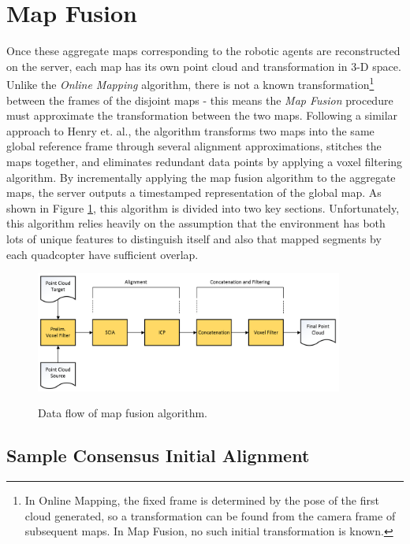 \documentclass[letterpaper, oneside, 10pt]{report}
\begin{document}
\section{Map Fusion}
\noindent Once these aggregate maps corresponding to the robotic agents are reconstructed on the server, each map has its own point cloud and transformation in 3-D space. Unlike the \textsl{Online Mapping} algorithm, there is not a known transformation\footnote{In Online Mapping, the fixed frame is determined by the pose of the first cloud generated, so a transformation can be found from the camera frame of subsequent maps. In Map Fusion, no such initial transformation is known.} between the frames of the disjoint maps - this means the \textsl{Map Fusion} procedure must approximate the transformation between the two maps. Following a similar approach to Henry et. al.\cite{henry2012rgb}, the algorithm transforms two maps into the same global reference frame through several alignment approximations, stitches the maps together, and eliminates redundant data points by applying a voxel filtering algorithm. By incrementally applying the map fusion algorithm to the aggregate maps, the server outputs a timestamped representation of the global map. As shown in Figure \ref{fig: map fusion.}, this algorithm is divided into two key sections. Unfortunately, this algorithm relies heavily on the assumption that the environment has both lots of unique features to distinguish itself and also that mapped segments by each quadcopter have sufficient overlap.

\begin{figure}[h!]
 \caption{Data flow of map fusion algorithm.}
 \centering
   \includegraphics[width=0.9\textwidth]{images/mapfusion}
 \label{fig: map fusion.}
\end{figure}

    \subsection{Sample Consensus Initial Alignment}
\end{document}
